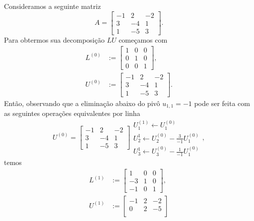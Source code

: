\begin{ex}\label{ex:lu}
  Consideramos a seguinte matriz
  \begin{equation}
    A =
    \begin{bmatrix}
      -1 & 2 & -2\\
      3 & -4 & 1\\
      1 & -5 & 3
    \end{bmatrix}.
  \end{equation}
  Para obtermos sua decomposição $LU$ começamos com
  \begin{align}
    L^{(0)} &:=
    \begin{bmatrix}
      1 & 0 & 0\\
      0 & 1 & 0\\
      0 & 0 & 1
    \end{bmatrix},\\
    U^{(0)} &:=
    \begin{bmatrix}
      -1 & 2 & -2\\
      3 & -4 & 1\\
      1 & -5 & 3
    \end{bmatrix}.
  \end{align}
  Então, observando que a eliminação abaixo do pivô $u_{1,1}=-1$ pode ser feita com as seguintes operações equivalentes por linha
  \begin{equation}
    U^{(0)} =
    \begin{bmatrix}
      -1 & 2 & -2\\
      3 & -4 & 1\\
      1 & -5 & 3
    \end{bmatrix}
    \begin{array}{l}
      U_1^{(1)}\leftarrow U_1^{(0)}\\
      U_2^{1}\leftarrow U_2^{(0)} - \frac{3}{-1}U_1^{(0)}\\
      U_3^{1}\leftarrow U_3^{(0)} - \frac{1}{-1}U_1^{(0)}
    \end{array},
  \end{equation}
  temos
  \begin{align}
    L^{(1)} &:=
    \begin{bmatrix}
      1 & 0 & 0\\
      -3 & 1 & 0\\
      -1 & 0 & 1
    \end{bmatrix},\\
    U^{(1)} &:=
    \begin{bmatrix}
      -1 & 2 & -2\\
      0 & 2 & -5\\

\end{bmatrix}
\end{align}
\end{ex}
